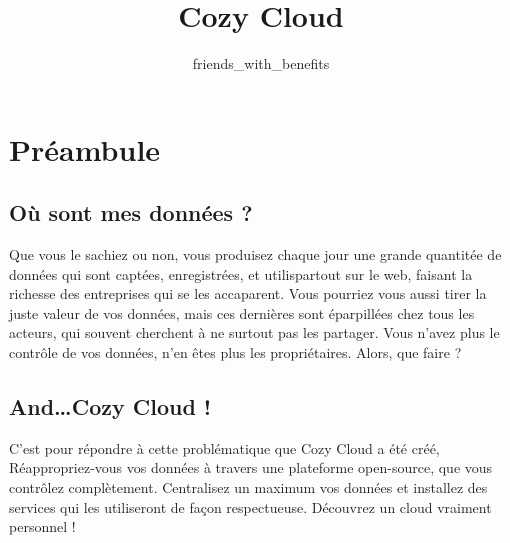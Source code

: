 \documentclass{42-fr}
\begin{document}
                           \title{Cozy Cloud}
                          \subtitle{friends\_with\_benefits}


\maketitle

\tableofcontents


\chapter{Préambule}


	\section{O\`u sont mes donn\'ees ?}

		Que vous le sachiez ou non, vous produisez chaque jour une grande quantit\'ee de donn\'ees
		qui sont capt\'ees, enregistr\'ees, et utilis\ees partout sur le web, faisant 
		la richesse des entreprises qui se les accaparent. Vous pourriez vous aussi
		tirer la juste valeur de vos donn\'ees, mais ces dernières sont \'eparpill\'ees
		chez tous les acteurs, qui souvent cherchent \`a ne surtout pas les partager.
		Vous n'avez plus le contrôle de vos donn\'ees, n'en \^etes plus les propri\'etaires.
		Alors, que faire ?


	\section{And…Cozy Cloud !}

		C'est pour r\'epondre \`a cette probl\'ematique que Cozy Cloud a \'et\'e  cr\'e\'e,
		R\'eappropriez-vous vos donn\'ees à travers une plateforme open-source, que vous contr\^olez
		compl\`etement. Centralisez un maximum vos donn\'ees et installez des services
		qui les utiliseront de façon respectueuse. D\'ecouvrez un cloud vraiment personnel !
\end{document}
